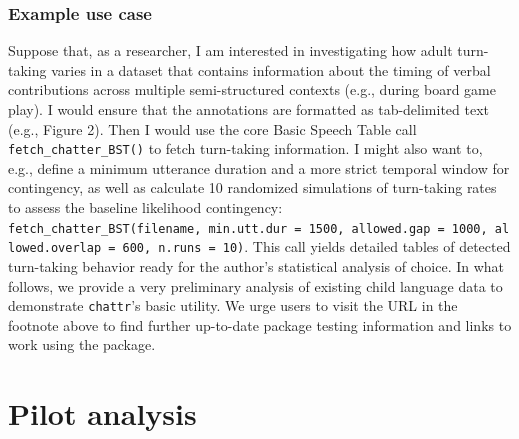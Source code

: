 \documentclass[10pt, letterpaper]{article}
\begin{document}
\hypertarget{example-use-case}{%
\subsubsection{Example use case}\label{example-use-case}}

Suppose that, as a researcher, I am interested in investigating how
adult turn-taking varies in a dataset that contains information about
the timing of verbal contributions across multiple semi-structured
contexts (e.g., during board game play). I would ensure that the
annotations are formatted as tab-delimited text (e.g., Figure 2). Then I
would use the core Basic Speech Table call
\texttt{fetch\_chatter\_BST()} to fetch turn-taking information. I might
also want to, e.g., define a minimum utterance duration and a more
strict temporal window for contingency, as well as calculate 10
randomized simulations of turn-taking rates to assess the baseline
likelihood contingency:
\texttt{fetch\_chatter\_BST(filename,\ min.utt.dur\ =\ 1500,\ allowed.gap\ =\ 1000,\ allowed.overlap\ =\ 600,\ n.runs\ =\ 10)}.
This call yields detailed tables of detected turn-taking behavior ready
for the author's statistical analysis of choice. In what follows, we
provide a very preliminary analysis of existing child language data to
demonstrate \texttt{chattr}'s basic utility. We urge users to visit the
URL in the footnote above to find further up-to-date package testing
information and links to work using the package.

\hypertarget{pilot-analysis}{%
\section{Pilot analysis}\label{pilot-analysis}}
\end{document}
